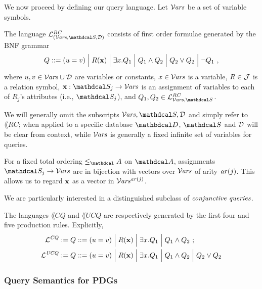 \documentclass{article}
\begin{document}
We now proceed by defining our query language. 
\def\Varis{\V\kern-.65pt\mathit{ars}}%
\def\Bmid{\mathrel{\Big|}}%
Let $\Varis$ be a set of variable symbols.
\begin{defn}
	The language $\lang{RC}_{(\Varis, \sch, \Doms)}$ consists of first order formulae generated by the BNF
	grammar
	\[ Q ::= (u=v) \Bmid R(\mat x)  \Bmid \exists x. Q_1 \Bmid Q_1 \land Q_2 \Bmid Q_2 \lor Q_2 \Bmid \lnot Q_1 ~, \]
	where $u,v \in \Varis \cup \Doms$ are variables
 	or constants, $x \in \Varis$ is a variable,
 	$R \in \mathcal J$ is a relation symbol, $\mat x  : \sch_j \to {\Varis }$ is an assignment of variables to each of $R_j$'s attributes (i.e., $\sch_j$), and $Q_1, Q_2 \in \lang{RC}_{\Varis,\sch}$.
\end{defn}

We will generally omit the subscripts $\Varis,\sch,\Doms$ and simply refer to $\lang{RC}$; when applied to a specific database $\D$, $\sch$ and ${\mathcal D}$ will be clear from context, while $\Varis$ is generally a fixed infinite set of variables for queries. 

For a fixed total ordering $\leq_\Attrs$ on $\Attrs$, assignments $\sch_j \to \Varis$ are in bijection with vectors over $\Varis$ of arity $\mathit{ar}(j)$. This allows us to regard $\mathbf x$ as a vector in $\Varis^{\arity(j)}$. 

We are particularly interested in a distinguished subclass of $\emph{conjunctive queries}$. 
\begin{defn}[CQ,UCQ]
	The languages $\lang{CQ}$ and $\lang{UCQ}$ are respectively generated by the first four and five production rules. Explicitly,
	\begin{align*}
		\lang{CQ} &:= Q ::= (u=v) \Bmid R(\mat x)  \Bmid \exists x. Q_1 \Bmid Q_1 \land Q_2 ~; \\
		\lang{UCQ} &:= Q ::= (u=v) \Bmid R(\mat x)  \Bmid \exists x. Q_1 \Bmid Q_1 \land Q_2 \Bmid Q_2 \lor Q_2  
	\end{align*}
\end{defn}

\subsubsection{Query Semantics for PDGs}
\end{document}
